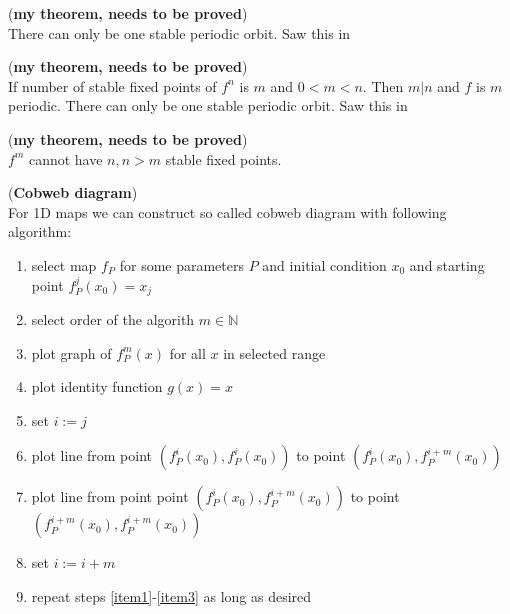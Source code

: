 \begin{theorem} (\textbf{my theorem, needs to be proved})\\
There can only be one stable periodic orbit. Saw this in \cite{Collet2009}
\end{theorem}

\begin{theorem} (\textbf{my theorem, needs to be proved})\\
If number of stable fixed points of $f^n$ is $m$ and $0<m<n$.
Then $m|n$ and $f$ is $m$ periodic.
There can only be one stable periodic orbit. Saw this in \cite{Collet2009}
\end{theorem}

\begin{theorem} (\textbf{my theorem, needs to be proved})\\
    $f^m$ cannot have $n, n>m$ stable fixed points.
\end{theorem}

\begin{definition} (\textbf{Cobweb diagram}) \\
    \label{def:cobweb}
    For 1D maps we can construct so called cobweb diagram with following algorithm:
    \begin{enumerate}
        \item select map $f_P$ for some parameters $P$ and initial condition $x_0$ and starting point $f^{j}_P(x_0) = x_j$
        \item select order of the algorith $m \in \mathbb{N}$
        \item plot graph of $f^{m}_P(x)$ for all $x$ in selected range
        \item plot identity function $g(x) = x$
        \item set $i:=j$

        \item plot line from point $(f^{i}_P(x_0), f^{i}_P(x_0))$ to point $(f^{i}_P(x_0), f^{i+m}_P(x_0))$ \label{item1}
        \item plot line from point point $(f^{i}_P(x_0), f^{i+m}_P(x_0))$ to point $(f^{i+m}_P(x_0), f^{i+m}_P(x_0))$ \label{item2}
        \item set $i:=i+m$ \label{item3}

        \item repeat steps \ref{item1}-\ref{item3} as long as desired
    \end{enumerate}

\end{definition}

